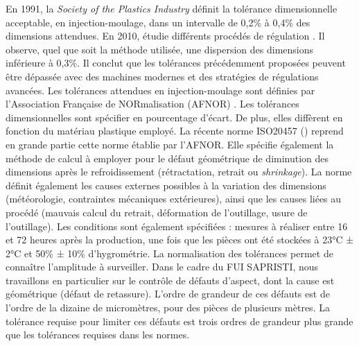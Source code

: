 En 1991, la \textit{Society of the Plastics Industry} \cite{berins_spi_1991} définit la tolérance dimensionnelle acceptable, en injection-moulage, dans un intervalle de 0,2\% à 0,4\% des dimensions attendues.
En 2010, \citeauthor{kazmer_comparison_2010} étudie différents procédés de régulation \cite{kazmer_comparison_2010}. Il observe, quel que soit la méthode utilisée, une dispersion des dimensions inférieure à 0,3\%.
Il conclut que les tolérances précédemment proposées peuvent être dépassée avec des machines modernes et des stratégies de régulations avancées.
Les tolérances attendues en injection-moulage sont définies par l’Association Française de NORmalisation (AFNOR) \cite{afnor_nf_1987}.
Les tolérances dimensionnelles sont spécifier en pourcentage d'écart.
De plus, elles diffèrent en fonction du matériau plastique employé.
La récente norme ISO20457 (\cite{ISO_20457_2018}) reprend en grande partie cette norme établie par l'AFNOR.
Elle spécifie également la méthode de calcul à employer pour le défaut géométrique de diminution des dimensions après le refroidissement (rétractation, retrait ou \textit{shrinkage}).
La norme définit également les causes externes possibles à la variation des dimensions (météorologie, contraintes mécaniques extérieures), ainsi que les causes liées au procédé (mauvais calcul du retrait, déformation de l'outillage, usure de l'outillage).
Les conditions sont également spécifiées : mesures à réaliser entre 16 et 72 heures après la production, une fois que les pièces ont été stockées à 23°C ± 2°C et 50\% ± 10\% d'hygrométrie.
La normalisation des tolérances permet de connaître l'amplitude à surveiller.
Dans le cadre du FUI SAPRISTI, nous travaillons en particulier sur le contrôle de défauts d'aspect, dont la cause est géométrique (défaut de retassure).
L'ordre de grandeur de ces défauts est de l'ordre de la dizaine de micromètres, pour des pièces de plusieurs mètres.
La tolérance requise pour limiter ces défauts est trois ordres de grandeur plus grande que les tolérances requises dans les normes.

